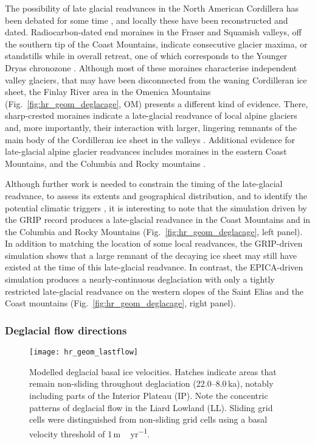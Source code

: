 \documentclass[tc, manuscript]{copernicus}
\begin{document}
The possibility of late glacial readvances in the North American Cordillera has
been debated for some time \citep{Osborn.Gerloff.1997}, and locally these have
been reconstructed and dated. Radiocarbon-dated end moraines in the Fraser and
Squamish valleys, off the southern tip of the Coast Mountains, indicate
consecutive glacier maxima, or standstills while in overall retreat, one of
which corresponds to the Younger Dryas chronozone \citep{Clague.etal.1997,
Friele.Clague.2002, Friele.Clague.2002a, Kovanen.2002,
Kovanen.Easterbrook.2002}. Although most of these moraines characterise
independent valley glaciers, that may have been disconnected from the waning
Cordilleran ice sheet, the Finlay River area in the Omenica Mountains
(Fig.~\ref{fig:hr_geom_deglacage}, OM) presents a different kind of evidence.
There, sharp-crested moraines indicate a late-glacial readvance of local alpine
glaciers and, more importantly, their interaction with larger, lingering
remnants of the main body of the Cordilleran ice sheet in the valleys
\citep{Lakeman.etal.2008}. Additional evidence for late-glacial
alpine glacier readvances includes moraines in the eastern Coast Mountains,
and the Columbia and Rocky mountains \citep{Osborn.Gerloff.1997,
Menounos.etal.2008}.

Although further work is needed to constrain the timing of the late-glacial
readvance, to assess its extents and geographical distribution, and to identify
the potential climatic triggers \citep{Menounos.etal.2008}, it is interesting
to note that the simulation driven by the GRIP record produces a late-glacial
readvance in the Coast Mountains and in the Columbia and Rocky Mountains
(Fig.~\ref{fig:hr_geom_deglacage},
left panel). In addition to matching the location of some local readvances, the
GRIP-driven simulation shows that a large remnant of the decaying ice sheet
may still have existed at the time of this late-glacial readvance.
In contrast, the EPICA-driven simulation produces a nearly-continuous
deglaciation with only a tightly restricted late-glacial readvance on the
western slopes of the Saint Elias and the Coast mountains
(Fig.~\ref{fig:hr_geom_deglacage}, right panel).


\subsubsection{Deglacial flow directions}

\begin{figure*}
  \texttt{[image: hr\_geom\_lastflow]}
  \caption{Modelled deglacial basal ice velocities. Hatches
           indicate areas that remain non-sliding throughout deglaciation
           (22.0--8.0\,ka), notably including parts of the Interior Plateau (IP).
           Note the concentric patterns of deglacial flow in the Liard
           Lowland (LL).
           Sliding grid cells were distinguished from non-sliding grid cells
           using a basal velocity threshold of 1\,\unit{m\,yr^{-1}}.}
  \label{fig:hr_geom_lastflow}
\end{figure*}
\end{document}
